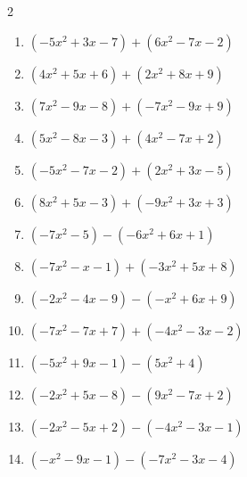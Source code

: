 \begin{multicols}{2}
\begin{enumerate}
  \item $(-5x^{2}+3x-7)+(6x^{2}-7x-2)$


  \item $(4x^{2}+5x+6)+(2x^{2}+8x+9)$


  \item $(7x^{2}-9x-8)+(-7x^{2}-9x+9)$

        \phantom{$=-18x+1$}

  \item $(5x^{2}-8x-3)+(4x^{2}-7x+2)$


  \item $(-5x^{2}-7x-2)+(2x^{2}+3x-5)$


  \item $(8x^{2}+5x-3)+(-9x^{2}+3x+3)$


  \item $(-7x^{2}-5)-(-6x^{2}+6x+1)$


  \item $(-7x^{2}-x-1)+(-3x^{2}+5x+8)$


  \item $(-2x^{2}-4x-9)-(-x^{2}+6x+9)$


  \item $(-7x^{2}-7x+7)+(-4x^{2}-3x-2)$


  \item $(-5x^{2}+9x-1)-(5x^{2}+4)$


  \item $(-2x^{2}+5x-8)-(9x^{2}-7x+2)$


  \item $(-2x^{2}-5x+2)-(-4x^{2}-3x-1)$


  \item $(-x^{2}-9x-1)-(-7x^{2}-3x-4)$


\end{enumerate}
\end{multicols}
